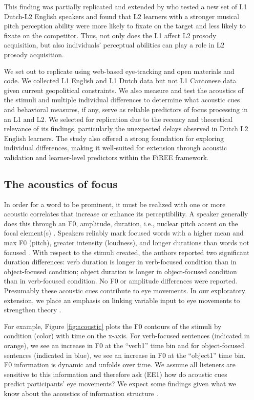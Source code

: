 This finding was partially replicated and extended by \textcite{jansen2023influence} who tested a new set of L1 Dutch-L2 English speakers and found that L2 learners with a stronger musical pitch perception ability were more likely to fixate on the target and less likely to fixate on the competitor. Thus, not only does the L1 affect L2 prosody acquisition, but also individuals' perceptual abilities can play a role in L2 prosody acquisition.

We set out to replicate \textcite{ge2021a} using web-based eye-tracking and open materials and code. We collected L1 English and L1 Dutch data but not L1 Cantonese data given current geopolitical constraints. We also measure and test the acoustics of the stimuli and multiple individual differences to determine what acoustic cues and behavioral measures, if any, serve as reliable predictors of focus processing in an L1 and L2. We selected \textcite{ge2021a} for replication due to the recency and theoretical relevance of its findings, particularly the unexpected delays observed in Dutch L2 English learners. The study also offered a strong foundation for exploring individual differences, making it well-suited for extension through acoustic validation and learner-level predictors within the FiREE framework.

\subsection{The acoustics of focus}
In order for a word to be prominent, it must be realized with one or more acoustic correlates that increase or enhance its perceptibility. A speaker generally does this through an F0, amplitude, duration, i.e., nuclear pitch accent on the focal element(s) \parencite{Gussenhoven1983}. Speakers reliably mark focused words with a higher mean and max F0 (pitch), greater intensity (loudness), and longer durations than words not focused \parencite{Breen2010}.
With respect to the stimuli \textcite{ge2021a} created, the authors reported two significant duration differences: verb duration is longer in verb-focused condition than in object-focused condition; object duration is longer in object-focused condition than in verb-focused condition. No F0 or amplitude differences were reported. Presumably these acoustic cues contribute to eye movements. In our exploratory extension, we place an emphasis on linking variable input to eye movements to strengthen theory \parencite{magnuson2019fixations}. 

For example, Figure \ref{fig:acoustic} plots the F0 contours of the stimuli by condition (color) with time on the x-axis. For verb-focused sentences (indicated in orange), we see an increase in F0 at the “verb1” time bin and for object-focused sentences (indicated in blue), we see an increase in F0 at the “object1” time bin. F0 information is dynamic and unfolds over time. We assume all listeners are sensitive to this information and therefore ask (EE1) how do acoustic cues predict  participants' eye movements? We expect some findings given what we know about the acoustics of information structure \parencite{Breen2010}.

